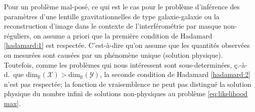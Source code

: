 Pour un problème mal-posé, ce qui est le cas pour le problème d'inférence des paramètres d'une lentille 
gravitationnelles de type galaxie-galaxie ou la reconstruction d'image dans le contexte de l'interférométrie  
par masque non-réguliers, 
on assume a priori que la première condition de Hadamard \ref{hadamard:1} est respectée. C'est-à-dire qu'on assume 
que les quantités observées ou mesurées sont causées par un phénomène unique (solution physique). 
Toutefois, comme les problèmes qui nous intéressent sont sous-determinées, 
ç.-à-d.\ que $\mathrm{dim}_{\mathbb{R}}(\mathcal{X}) > \mathrm{dim}_{\mathbb{R}}(\mathcal{Y})$,
la seconde condition de Hadamard \ref{hadamard:2} n'est pas respectée; la fonction de vraisemblence 
ne peut pas distingué la solution physique du nombre infini de solutions non-physiques au problème \eqref{eq:likelihood max}.


